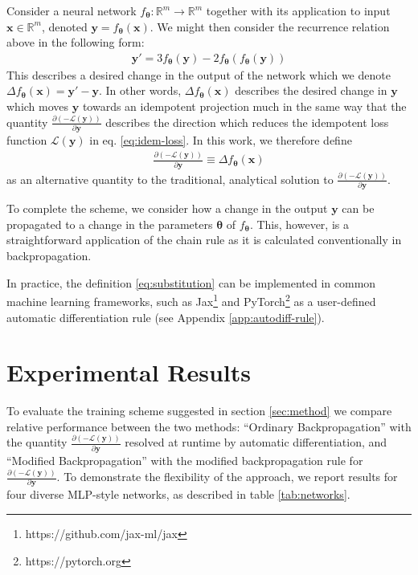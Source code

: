 \documentclass{article}
\newcommand{\vx}{\mathbf{x}}
\newcommand{\vy}{\mathbf{y}}
\newcommand{\vtheta}{\bm{\theta}}
\newcommand{\pd}[2]{\frac{\partial{#1}}{\partial{#2}}}
\begin{document}
Consider a neural network $f_{\vtheta}: \mathbb{R}^m \to \mathbb{R}^m$ together with its application to input $\vx \in \mathbb{R}^m$, denoted $\vy = f_{\vtheta}(\vx)$. We might then consider the recurrence relation above in the following form:
%
\begin{align*}
  \vy' = 3f_{\vtheta}(\vy) - 2f_{\vtheta}(f_{\vtheta}(\vy))
\end{align*}
%
This describes a desired change in the output of the network which we denote ${\Delta f_{\vtheta}(\vx) = \vy' - \vy}$. In other words, $\Delta f_{\vtheta}(\vx)$ describes the desired change in $\vy$ which moves $\vy$ towards an idempotent projection much in the same way that the quantity $\pd{(-\mathcal{L}(\vy))}{\vy}$ describes the direction which reduces the idempotent loss function $\mathcal{L}(\vy)$ in eq. \ref{eq:idem-loss}. In this work, we therefore define
%
\begin{align}
  \pd{(-\mathcal{L}(\vy))}{\vy} \equiv \Delta f_{\vtheta}(\vx)
  \label{eq:substitution}
\end{align}
%
as an alternative quantity to the traditional, analytical solution to $\pd{(-\mathcal{L}(\vy))}{\vy}$.

To complete the scheme, we consider how a change in the output $\vy$ can be propagated to a change in the parameters $\vtheta$ of $f_{\vtheta}$. This, however, is a straightforward application of the chain rule as it is calculated conventionally in backpropagation.

In practice, the definition \ref{eq:substitution} can be implemented in common machine learning frameworks, such as Jax\footnote{https://github.com/jax-ml/jax} and PyTorch\footnote{https://pytorch.org} as a user-defined automatic differentiation rule (see Appendix \ref{app:autodiff-rule}).



\section{Experimental Results}
\label{sec:experiment}
To evaluate the training scheme suggested in section \ref{sec:method} we compare relative performance between the two methods: ``Ordinary Backpropagation'' with the quantity $\pd{(-\mathcal{L}(\vy))}{\vy}$ resolved at runtime by automatic differentiation, and ``Modified Backpropagation'' with the modified backpropagation rule for $\pd{(-\mathcal{L}(\vy))}{\vy}$. To demonstrate the flexibility of the approach, we report results for four diverse MLP-style networks, as described in table \ref{tab:networks}.
\end{document}
